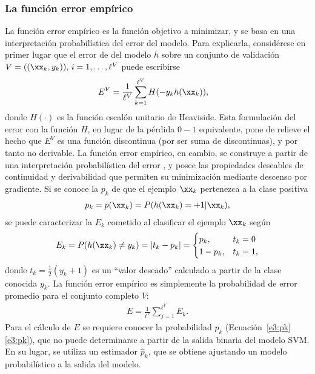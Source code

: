 %
\subsubsection{La función error empírico}
%
La función error empírico es la función objetivo a minimizar, y se
basa en una interpretación probabilística del error del modelo.
Para explicarla, considérese en primer lugar que el error de del
modelo $h$ sobre un conjunto de validación
$V=((\xx_k,y_k)),\,i=1,\ldots,\ell^V$ puede escribirse
%
\begin{align}
\label{e3:error-test-alt}
  E^V &= \frac{1}{\ell^V}\sum_{k=1}^{\ell^V} H(-{y}_k {h}(\xx_k)),
\end{align}
%
donde $H(\cdot)$ es la función escalón unitario de Heaviside.
Esta formulación del error con la función $H$, en lugar de la pérdida
$0-1$ equivalente, pone de relieve el hecho que $E^V$ es una función
discontinua (por ser suma de discontinuas), y por tanto no derivable.
La función error empírico, en cambio, se construye a partir de una
interpretación probabilística del error \cite{ayat}, y posee las
propiedades deseables de continuidad y derivabilidad que permiten
su minimización mediante descenso por gradiente.
Si se conoce la  $p_k$ de que el ejemplo
$\xx_k$ pertenezca a la clase positiva
%
\begin{align}
  \label{e3:pk}
  p_k = p(\xx_k) = P(h(\xx_k)=+1|\xx_k),
\end{align}
%
se puede caracterizar la  $E_k$ cometido al
clasificar el ejemplo $\xx_k$ según
%
\begin{align}
\label{e3:Ek}
  E_k = P(h(\xx_k)\neq y_k) = |t_k-{p}_k| =
  \begin{cases}
    {p}_k, & t_k=0\\ 1-{p}_k, & t_k = 1,
  \end{cases}
\end{align}
%
donde $t_k=\frac{1}{2}({y_k+1})$ es un ``valor deseado'' calculado a
partir de la clase conocida $y_k$.
La función error empírico es simplemente la probabilidad de error
promedio para el conjunto completo $V$:
%
\begin{align}
\label{Err1}
  E = \frac{1}{\ell^V}\sum_{j=1}^{\ell^V} E_k.
\end{align}
%
Para el cálculo de $E$ se requiere conocer la probabilidad $p_k$
(\iflatexml{}Ecuación~\ref{e3:pk}\else\autoref{e3:pk}\fi), que no
puede determinarse a partir de la salida binaria del modelo SVM.
En su lugar, se utiliza un estimador $\hat{p}_k$, que se obtiene
ajustando un modelo probabilístico a la salida del modelo.
